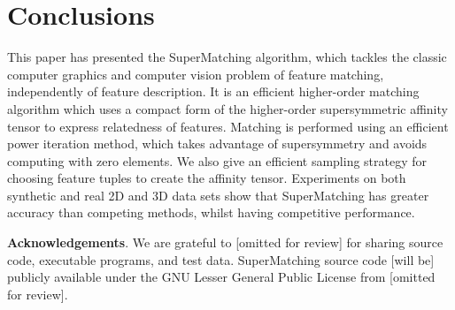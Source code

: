 \section{Conclusions}
\label{sec:conclusion}

This paper has presented the SuperMatching algorithm,
which tackles the classic computer graphics and computer vision problem of feature matching, independently of feature description.
It is an efficient higher-order matching algorithm which uses a compact form of the higher-order supersymmetric affinity tensor to express relatedness of features.
Matching is performed using an efficient power iteration method, which takes advantage of supersymmetry and avoids computing with zero elements.
We also give an efficient sampling strategy for choosing feature tuples to create the affinity tensor.
Experiments on both synthetic and real 2D and 3D data sets show that
SuperMatching has greater accuracy than competing methods, whilst having competitive performance.



\textbf{Acknowledgements}. We are grateful to [omitted for review] for sharing source code, executable programs, and test data.
SuperMatching source code [will be] publicly available under the GNU Lesser General Public License from [omitted for review].

